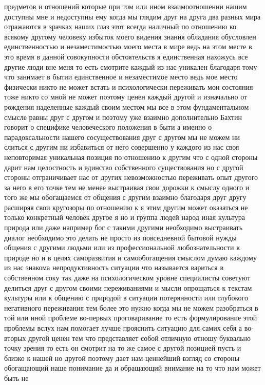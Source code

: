 предметов и отношений которые при том или ином взаимоотношении нашим доступны
мне и недоступны ему когда мы глядим друг на друга два разных мира отражаются в
зрачках наших глаз этот всегда наличный по отношению ко всякому другому человеку
избыток моего видения знания обладания обусловлен единственностью и
незаместимостью моего места в мире ведь на этом месте в это время в данной
совокупности обстоятельств я единственная нахожусь все другие люди вне меня то
есть смотрите каждый из нас уникален благодаря тому что занимает в бытии
единственное и незаместимое место ведь мое место физически никто не может встать
и психологически переживать мои состояния тоже никто со мной не может поэтому
ценен каждый другой и изначально от рождения наделенные каждый своим местом мы
все в этом фундаментальном смысле равны друг с другом и поэтому уже взаимно
дополнительно Бахтин говорит о специфике человеческого положения в быти а именно
о парадоксальности нашего сосуществования друг с другом мы не можем ни слиться с
другим ни избавиться от него совершенно у каждого из нас своя неповторимая
уникальная позиция по отношению к другим что с одной стороны дарит нам
целостность и единство собственного существования но с другой стороны
отграничивает нас от других невозможностью переживать опыт другого за него в его
точке тем не менее выстраивая свои дорожки к смыслу одного и того же мы
обогащаемся от общения с другим взаимно благодаря друг другу расширяя свои
кругозоры по отношению к я этим другим может оказаться не только конкретный
человек другое я но и группа людей народ иная культура природа или даже например
бог с такими другими необходимо выстраивать диалог необходимо это делать не
просто из повседневной бытовой нужды общения с другими людьми или из
профессиональной любознательности к природе но и в целях саморазвития и
самообогащения смыслом думаю каждому из нас знакома непродуктивность ситуации
что называется вариться в собственном соку так даже на психологическом уровне
специалисты советуют делиться друг с другом своими переживаниями и мысли
опрощаться к текстам культуры или к общению с природой в ситуации потерянности
или глубокого негативного переживания тем более это нужно когда мы не можем
разобраться в той или иной проблеме во-первых проговаривание то есть
формулирование этой проблемы вслух нам помогает лучше прояснить ситуацию для
самих себя а во-вторых другой ценен тем что представляет собой отличную отношу
буквально точку зрения то есть он смотрит на то же самое с другой позицией пусть
и близко к нашей но другой поэтому дает нам ценнейший взгляд со стороны
обогащающий наше понимание да и обращающий внимание на то что нам может быть не
